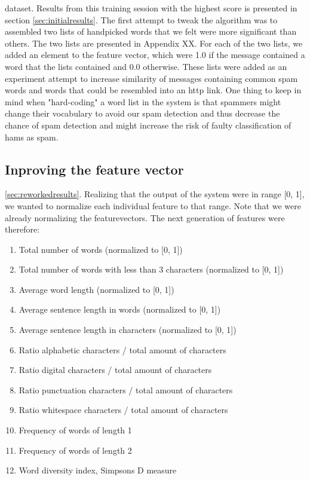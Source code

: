     dataset. Results from this training session with the highest score is
    presented in section \ref{sec:initialresults}. 
    The first attempt to tweak the algorithm was to assembled two lists of
    handpicked words that we felt were more significant than others. The two
    lists are presented in Appendix XX. For each of the two lists, we added an
    element to the feature vector, which were 1.0 if the message contained a
    word that the lists contained and 0.0 otherwise.   
    These lists were added as an experiment attempt to increase similarity of
    messages containing common spam words and words that could be resembled
    into an http link.
    One thing to keep in mind when "hard-coding" a word list in the system  is
    that spammers might change their vocabulary to avoid our spam detection and
    thus decrease the chance of spam detection and might increase the risk of
    faulty classification of hams as spam. 

  \subsection{Inproving the feature vector}
  \ref{sec:reworkedresults}.
    Realizing that the output of the system were in range [0, 1], we wanted to
    normalize each individual feature to that range. Note that we were already
    normalizing the featurevectors. The next generation of features were
    therefore:
    \begin{enumerate}
      \item Total number of words (normalized to [0, 1])
      \item Total number of words with less than 3 characters 
        (normalized to [0, 1]) 
      \item Average word length 
        (normalized to [0, 1]) 
      \item Average sentence length in words
        (normalized to [0, 1]) 
      \item Average sentence length in characters
        (normalized to [0, 1]) 
      \item Ratio alphabetic characters / total amount of characters
      \item Ratio digital characters / total amount of characters
      \item Ratio punctuation characters / total amount of characters
      \item Ratio whitespace characters / total amount of characters
      \item Frequency of words of length 1
      \item Frequency of words of length 2
      \item Word diversity index, Simpsons D measure \cite{simpsons-measure}
    \end{enumerate}
  
